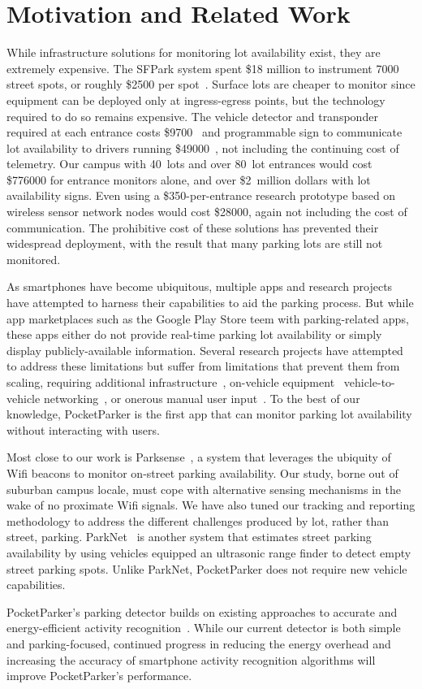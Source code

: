 \section{Motivation and Related Work} While infrastructure solutions for
monitoring lot availability exist, they are extremely expensive. The SFPark
system spent \$18 million to instrument \num{7000} street spots, or roughly
\$\num{2500} per spot~\cite{sfpark}. Surface lots are cheaper to monitor
since equipment can be deployed only at ingress-egress points, but the
technology required to do so remains expensive. The vehicle detector and
transponder required at each entrance costs \$\num{9700}~\cite{car-detect}
and programmable sign to communicate lot availability to drivers running
\$\num{49000}~\cite{mstp-park}, not including the continuing cost of
telemetry. Our campus with 40~lots and over 80~lot entrances would cost
\$\num{776000} for entrance monitors alone, and over \$2~million dollars with
lot availability signs. Even using a \$\num{350}-per-entrance research
prototype based on wireless sensor network nodes would cost \$\num{28000},
again not including the cost of communication. The prohibitive cost of these
solutions has prevented their widespread deployment, with the result that
many parking lots are still not monitored.

As smartphones have become ubiquitous, multiple apps and research projects
have attempted to harness their capabilities to aid the parking process. But
while app marketplaces such as the Google Play Store teem with
parking-related apps, these apps either do not provide real-time parking lot
availability or simply display publicly-available information. Several
research projects have attempted to address these limitations but suffer from
limitations that prevent them from scaling, requiring additional
infrastructure~\cite{5062057}, on-vehicle equipment~\cite{Mathur:2010:PDS}
vehicle-to-vehicle networking~\cite{Delot:2009:CRP, Mathur:2010:PDS}, or
onerous manual user input~\cite{Chen:2012:COS}. To the best of our knowledge,
PocketParker is the first app that can monitor parking lot availability
without interacting with users.

Most close to our work is Parksense~\cite{Nawaz:2013:PSB}, a system that
leverages the ubiquity of Wifi beacons to monitor on-street parking
availability. Our study, borne out of suburban campus locale, must cope with
alternative sensing mechanisms in the wake of no proximate Wifi signals. We
have also tuned our tracking and reporting methodology to address the
different challenges produced by lot, rather than street, parking.
ParkNet~\cite{Mathur:2010:PDS} is another system that estimates street
parking availability by using vehicles equipped an ultrasonic range finder to
detect empty street parking spots. Unlike ParkNet, PocketParker does not
require new vehicle capabilities.

PocketParker's parking detector builds on existing approaches to accurate
and energy-efficient activity recognition~\cite{Constandache:2010:DYS,
Keally:2011:PTP, Reddy:2010:UMP, Yang:2011:DDP, Wang:2009:FEE}. While our
current detector is both simple and parking-focused, continued progress in
reducing the energy overhead and increasing the accuracy of smartphone
activity recognition algorithms will improve PocketParker's performance.
